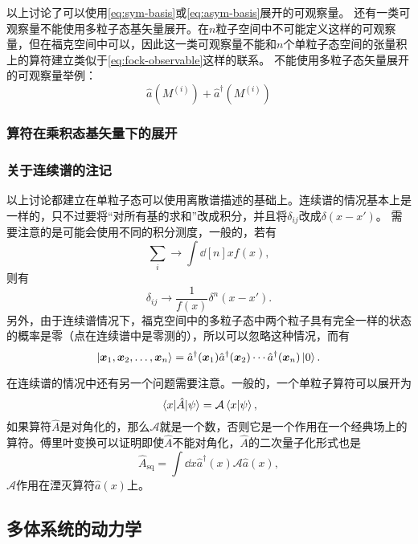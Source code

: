 \documentclass[hyperref, UTF8, a4paper]{ctexart}
\begin{document}
以上讨论了可以使用\eqref{eq:sym-basis}或\eqref{eq:asym-basis}展开的可观察量。
还有一类可观察量不能使用多粒子态基矢量展开。在$n$粒子空间中不可能定义这样的可观察量，但在福克空间中可以，因此这一类可观察量不能和$n$个单粒子态空间的张量积上的算符建立类似于\eqref{eq:fock-observable}这样的联系。
不能使用多粒子态矢量展开的可观察量举例：
\[
    \hat{a}(M^{(i)}) + \hat{a}^\dagger(M^{(i)})
\]

\subsubsection{算符在乘积态基矢量下的展开}


\subsubsection{关于连续谱的注记}

以上讨论都建立在单粒子态可以使用离散谱描述的基础上。连续谱的情况基本上是一样的，只不过要将“对所有基的求和”改成积分，并且将$\delta_{ij}$改成$\delta(x - x')$。
需要注意的是可能会使用不同的积分测度，一般的，若有
\[
    \sum_i \longrightarrow \int \dd[n]{x} f(x),
\]
则有
\[
    \delta_{ij} \longrightarrow \frac{1}{f(x)} \delta^n(x - x').
\]
另外，由于连续谱情况下，福克空间中的多粒子态中两个粒子具有完全一样的状态的概率是零（点在连续谱中是零测的），所以可以忽略这种情况，而有
\begin{equation}
    \ket{\vb*{x}_1, \vb*{x}_2, \ldots, \vb*{x}_n} = \hat{a}^\dagger(\vb*{x}_1) \hat{a}^\dagger(\vb*{x}_2) \cdots \hat{a}^\dagger (\vb*{x}_n ) \ket{0}.
\end{equation}

在连续谱的情况中还有另一个问题需要注意。一般的，一个单粒子算符可以展开为
\[
    \mel{x}{\hat{A}}{\psi} = \mathcal{A} \braket{x}{\psi},
\]
如果算符$\hat{A}$是对角化的，那么$\mathcal{A}$就是一个数，否则它是一个作用在一个经典场上的算符。傅里叶变换可以证明即使$\hat{A}$不能对角化，$\hat{A}$的二次量子化形式也是
\[
    \hat{A}_\text{sq} = \int \dd{x} \hat{a}^\dagger (x) \mathcal{A} \hat{a}(x), 
\]
$\mathcal{A}$作用在湮灭算符$\hat{a}(x)$上。

\subsection{多体系统的动力学}\label{sec:many-body-dynamics}
\end{document}
